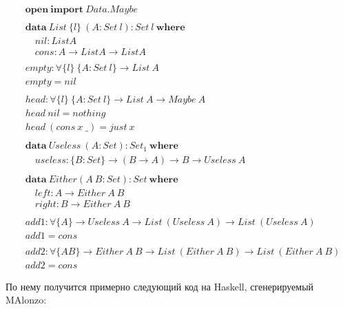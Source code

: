 \begin{align*}
&\mathbf{open\ import}\ Data.Maybe\\
\\
&\mathbf{data}\ List\ \{l\}\ (A : Set\ l) : Set\ l\ \mathbf{where}\\
&\quad nil : List A\\
&\quad cons : A \rightarrow List A \rightarrow List A\\
\\
&empty : \forall \{l\}\ \{A : Set\ l\} \rightarrow List\ A\\
&empty = nil\\
\\
&head : \forall \{l\}\ \{A : Set\ l\} \rightarrow List\ A \rightarrow Maybe\ A\\
&head\ nil = nothing\\
&head\ (cons\ x\ \_) = just\ x\\
\\
&\mathbf{data}\ Useless\ (A : Set) : Set_1\ \mathbf{where}\\
&\quad useless : \{B : Set\} \rightarrow (B \rightarrow A) \rightarrow B
   \rightarrow Useless\ A\\
\\
&\mathbf{data}\ Either (A\ B : Set) : Set\ \mathbf{where}\\
&\quad left : A \rightarrow Either\ A\ B\\
&\quad right : B \rightarrow Either\ A\ B\\
\\
&add1 : \forall \{A\} \rightarrow Useless\ A \rightarrow List\ (Useless\ A)
   \rightarrow List\ (Useless\ A)\\
&add1 = cons\\
\\
&add2 : \forall \{A B\} \rightarrow Either\ A\ B \rightarrow List\ (Either\ A\ B)
   \rightarrow List\ (Either\ A\ B)\\
&add2 = cons
\end{align*}

По нему получится примерно следующий код на Haskell, сгенерируемый MAlonzo:

